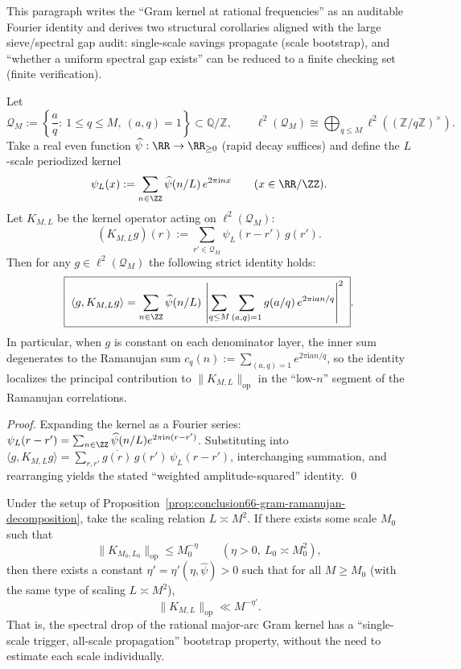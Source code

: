 This paragraph writes the ``Gram kernel at rational frequencies'' as an auditable Fourier identity and derives two structural corollaries aligned with the large sieve/spectral gap audit: single-scale savings propagate (scale bootstrap), and ``whether a uniform spectral gap exists'' can be reduced to a finite checking set (finite verification).

\begin{proposition}\label{prop:conclusion66-gram-ramanujan-decomposition}
Let
\[
\mathcal{Q}_M:=\left\{\frac{a}{q}:\ 1\le q\le M,\ (a,q)=1\right\}\subset\mathbb{Q}/\mathbb{Z},
\qquad
\ell^2(\mathcal{Q}_M)\cong\bigoplus_{q\le M}\ell^2((\mathbb{Z}/q\mathbb{Z})^\times).
\]
Take a real even function \(\widehat\psi:\RR\to\RR_{\ge 0}\) (rapid decay suffices) and define the \(L\)-scale periodized kernel
\[
\psi_L(x):=\sum_{n\in\ZZ}\widehat\psi(n/L)\,e^{2\pi\mathrm{i}nx}\qquad(x\in\RR/\ZZ).
\]
Let \(K_{M,L}\) be the kernel operator acting on \(\ell^2(\mathcal{Q}_M)\):
\[
(K_{M,L}g)(r):=\sum_{r'\in\mathcal{Q}_M}\psi_L(r-r')\,g(r').
\]
Then for any \(g\in\ell^2(\mathcal{Q}_M)\) the following strict identity holds:
\[
\boxed{\;
\langle g,K_{M,L}g\rangle
=\sum_{n\in\ZZ}\widehat\psi(n/L)\,
\left|\sum_{q\le M}\sum_{\substack{(a,q)=1}} g(a/q)\,e^{2\pi\mathrm{i}an/q}\right|^2\; }.
\]
In particular, when \(g\) is constant on each denominator layer, the inner sum degenerates to the Ramanujan sum
\(
c_q(n):=\sum_{(a,q)=1}e^{2\pi\mathrm{i}an/q}
\),
so the identity localizes the principal contribution to \(\|K_{M,L}\|_{\mathrm{op}}\) in the ``low-\(n\)'' segment of the Ramanujan correlations.
\end{proposition}

\begin{proof}
Expanding the kernel as a Fourier series:
\(
\psi_L(r-r')=\sum_{n\in\ZZ}\widehat\psi(n/L)e^{2\pi\mathrm{i}n(r-r')}
\).
Substituting into
\(
\langle g,K_{M,L}g\rangle=\sum_{r,r'}\overline{g(r)}\,g(r')\,\psi_L(r-r')
\),
interchanging summation, and rearranging yields the stated ``weighted amplitude-squared'' identity. \qed
\end{proof}

\begin{theorem}\label{thm:conclusion67-scale-bootstrap}
Under the setup of Proposition~\ref{prop:conclusion66-gram-ramanujan-decomposition}, take the scaling relation \(L\asymp M^{2}\).
If there exists some scale \(M_0\) such that
\[
\|K_{M_0,L_0}\|_{\mathrm{op}}\le M_0^{-\eta}\qquad(\eta>0,\ L_0\asymp M_0^2),
\]
then there exists a constant \(\eta'=\eta'(\eta,\widehat\psi)>0\) such that for all \(M\ge M_0\) (with the same type of scaling \(L\asymp M^2\)),
\[
\boxed{\;
\|K_{M,L}\|_{\mathrm{op}}\ll M^{-\eta'}.\;}
\]
That is, the spectral drop of the rational major-arc Gram kernel has a ``single-scale trigger, all-scale propagation'' bootstrap property, without the need to estimate each scale individually.
\end{theorem}

